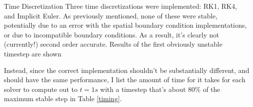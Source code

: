 \documentclass{article}
\begin{document}
\begin{section}{Time Discretization}
Three time discretizations were implemented: RK1, RK4, and Implicit Euler.
As previously mentioned, none of these were stable, potentially due to an error with the spatial boundary condition implementations, or due to incompatible boundary conditions.
As a result, it's clearly not (currently!) second order accurate.
Results of the first obviously unstable timestep are shown

Instead, since the correct implementation shouldn't be substantially different, and should have the same performance, I list the amount of time for it takes for each solver to compute out to $t = 1 s$ with a timestep that's about $80\%$ of the maximum stable step in Table \ref{timing}.

\begin{table}[ht]
  \caption{Compute time required to reach $t=1.0$}
  \label{timing}
\end{table}

\end{section}
\end{document}
